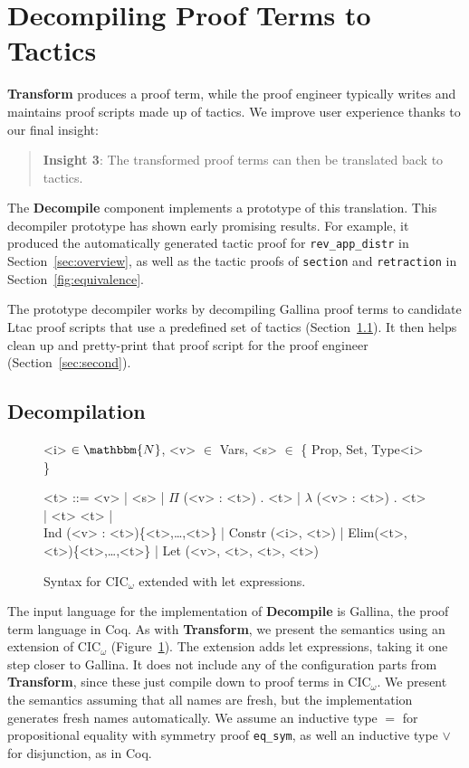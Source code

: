 \section{Decompiling Proof Terms to Tactics}
\label{sec:decompiler}

\textbf{Transform} produces a proof term,
while the proof engineer typically writes and maintains proof scripts made up of tactics.
We improve user experience thanks to our final insight:

\begin{quote}
\textbf{Insight 3}: The transformed proof terms can then be translated back to tactics.
\end{quote}

The \textbf{Decompile} component implements a prototype of this translation.
This decompiler prototype has shown early promising results.
For example, it produced the automatically generated tactic proof for \lstinline{rev_app_distr} 
in Section~\ref{sec:overview}, as well as the tactic proofs of \lstinline{section}
and \lstinline{retraction} in Section~\ref{fig:equivalence}.

The prototype decompiler works by decompiling Gallina proof terms to candidate Ltac proof scripts that 
use a predefined set of tactics (Section~\ref{sec:first}).
It then helps clean up and pretty-print that proof script for the proof engineer (Section~\ref{sec:second}).

\subsection{Decompilation}
\label{sec:first}

\begin{figure}
\small
\begin{grammar}
<i> $\in \mathbbm{N}$, <v> $\in$ Vars, <s> $\in$ \{ Prop, Set, Type<i> \}

<t> ::= <v> | <s> | $\Pi$ (<v> : <t>) . <t> | $\lambda$ (<v> : <t>) . <t> | <t> <t> | \\
Ind (<v> : <t>)\{<t>,\ldots,<t>\} | Constr (<i>, <t>) | Elim(<t>, <t>)\{<t>,\ldots,<t>\} | Let (<v>, <t>, <t>, <t>)
\end{grammar}
\caption{Syntax for CIC$_{\omega}$ extended with let expressions.}
\label{fig:gallinasyntax}
\end{figure}

The input language for the implementation of \textbf{Decompile} is Gallina, the proof term language in Coq.
As with \textbf{Transform}, we present the semantics using an extension of CIC$_{\omega}$ (Figure~\ref{fig:gallinasyntax}).
The extension adds let expressions, taking it one step closer to Gallina.
It does not include any of the configuration parts from \textbf{Transform}, since these just compile down to proof terms in CIC$_{\omega}$.
We present the semantics assuming that all names are fresh, but the implementation generates fresh names automatically.
We assume an inductive type $=$ for propositional equality with symmetry proof \lstinline{eq_sym},
as well an inductive type $\vee$ for disjunction, as in Coq.

